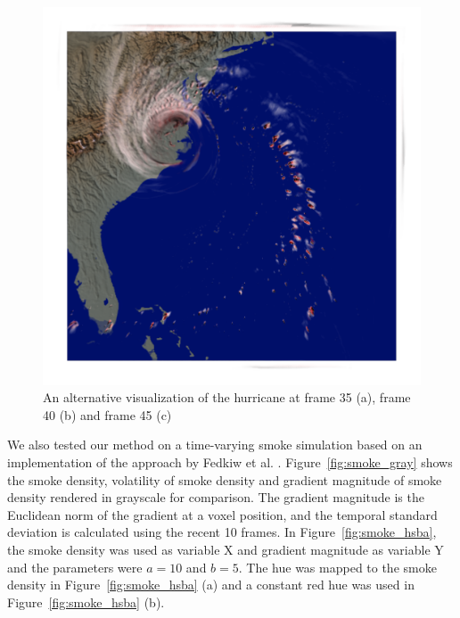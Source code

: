 \begin{figure}
\begin{minipage}{.33\textwidth}
	\subcaption{}
\end{minipage}~
\begin{minipage}{.33\textwidth}
	\includegraphics[width=1\linewidth]{figures/hurricane_hsba_0_10stdprecip_1-4cloud_precip_45}
	\subcaption{}
\end{minipage}
\caption{An alternative visualization of the hurricane at frame 35 (a), frame 40 (b) and frame 45 (c)}
\label{fig:hurricane_precip}
\end{figure}

We also tested our method on a time-varying smoke simulation based on an implementation of the approach by Fedkiw et al. \cite{fedkiw_visual_2001}. Figure~\ref{fig:smoke_gray} shows the smoke density, volatility of smoke density and gradient magnitude of smoke density rendered in grayscale for comparison.
The gradient magnitude is the Euclidean norm of the gradient at a voxel position,
and the temporal standard deviation is calculated using the recent 10 frames.
In Figure~\ref{fig:smoke_hsba}, the smoke density was used as variable X and gradient magnitude as variable Y and the parameters were $a=10$ and $b=5$.
The hue was mapped to the smoke density in Figure~\ref{fig:smoke_hsba} (a) and a constant red hue was used in Figure~\ref{fig:smoke_hsba} (b).

